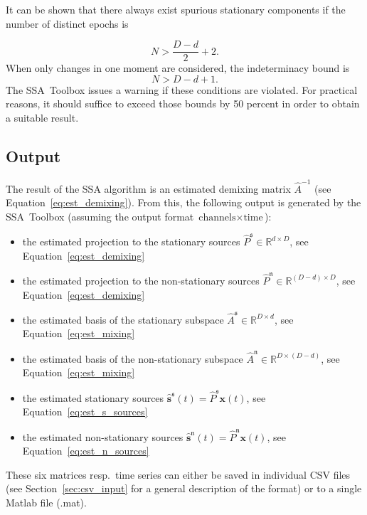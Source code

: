 \documentclass{article}
\newcommand{\R}{\ensuremath{\mathds{R}}}
\newcommand{\1}{\ensuremath{\mathds{1}}}
\newcommand{\s}{\ensuremath{\mathfrak{s}}}
\newcommand{\n}{\ensuremath{\mathfrak{n}}}
\newcommand{\0}{\ensuremath{0}}
\begin{document}
It can be shown \cite{PRL:SSA:2009} that there always exist spurious stationary components
if the number of distinct epochs is
 
\begin{equation*}
	N > \frac{D-d}{2} + 2.
\end{equation*}
When only changes in one moment are considered, the indeterminacy bound is
\begin{equation*}
	N > D-d + 1 .
\end{equation*}
The SSA~Toolbox issues a warning if these conditions are violated.
For practical reasons, it should suffice to exceed those bounds by 50
percent in order to obtain a suitable result.

\subsection{Output}

The result of the SSA algorithm is an estimated demixing matrix $\hat{A}^{-1}$
(see Equation~\ref{eq:est_demixing}). From this, the following output
is generated by the SSA~Toolbox (assuming the output format $\text{channels} \times \text{time}$):
\begin{itemize}
	\item the estimated projection to the stationary sources $\hat{P}^\s \in \R^{d \times D}$, 
				see Equation~\ref{eq:est_demixing}
						
	\item the estimated projection to the non-stationary sources $\hat{P}^\n \in \R^{ (D-d) \times D}$, 
		see Equation~\ref{eq:est_demixing}

	\item the estimated basis of the stationary subspace $\hat{A}^\s \in \R^{D \times d}$, 
		see Equation~\ref{eq:est_mixing}
	
	\item the estimated basis of the non-stationary subspace $\hat{A}^\n \in \R^{D \times (D-d)}$,
		see Equation~\ref{eq:est_mixing}

	\item the estimated stationary sources $\hat{\mathbf s}^\s(t) = \hat{P}^\s {\mathbf x}(t)$, 
		see Equation~\ref{eq:est_s_sources}
	
	\item the estimated non-stationary sources $\hat{\mathbf s}^\n(t) = \hat{P}^\n {\mathbf x}(t) $,
		see Equation~\ref{eq:est_n_sources}
	
\end{itemize}
These six matrices resp.~time series can either be saved in individual CSV files 
(see Section~\ref{sec:csv_input} for a general description of the format) or to a single
Matlab file (.mat). 
\end{document}
